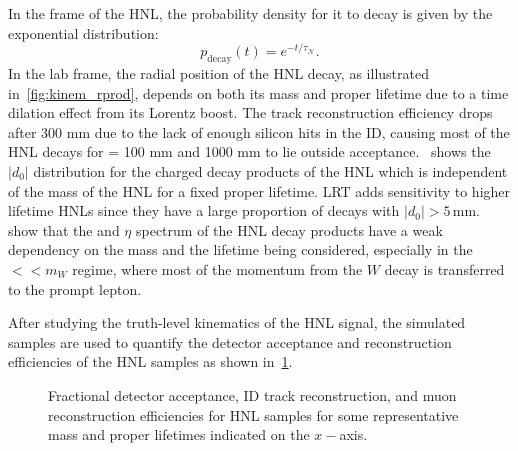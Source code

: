 In the frame of the HNL, the probability density for it to decay is given by the exponential distribution:
\begin{equation}
    p_\mathrm{decay}(t)=e^{-t/\tau_\mathcal{N}}.
\end{equation}
In the lab frame, the radial position of the HNL decay, as illustrated in~\cref{fig:kinem_rprod}, depends on both its mass and proper lifetime due to a time dilation effect from its Lorentz boost. The track reconstruction efficiency drops after 300 mm due to the lack of enough silicon hits in the ID, causing most of the HNL decays for \ctau = 100 mm and 1000 mm to lie outside acceptance.~ shows the $|d_0|$ distribution for the charged decay products of the HNL which is independent of the mass of the HNL for a fixed proper lifetime. LRT adds sensitivity to higher lifetime HNLs since they have a large proportion of decays with $|d_0|>5\,$mm.~ show that the \pT and $\eta$ spectrum of the HNL decay products have a weak dependency on the mass and the lifetime being considered, especially in the \mhnl$<<m_W$ regime, where most of the momentum from the $W$ decay is transferred to the prompt lepton.

After studying the truth-level kinematics of the HNL signal, the simulated samples are used to quantify the detector acceptance and reconstruction efficiencies of the HNL samples as shown in~\cref{fig:acc_and_eff}.

\begin{figure}[!ht]
    \centering
     \caption{Fractional detector acceptance, ID track reconstruction, and muon reconstruction efficiencies for \uuu HNL samples for some representative mass and proper lifetimes indicated on the $x-$axis.}
     \label{fig:acc_and_eff}
 \end{figure}

